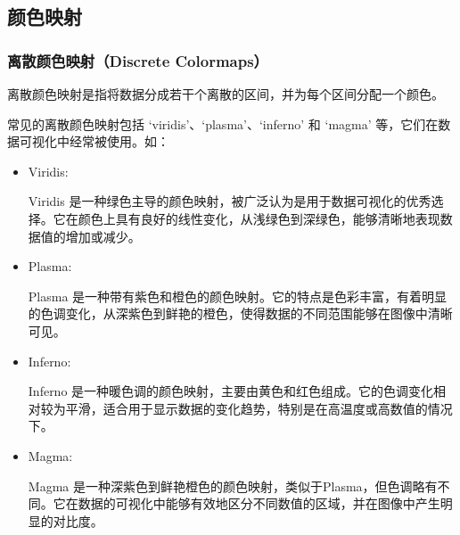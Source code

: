 \documentclass{article}
\begin{document}
\subsection{颜色映射}

\subsubsection{离散颜色映射（Discrete Colormaps）}
离散颜色映射是指将数据分成若干个离散的区间，并为每个区间分配一个颜色。

常见的离散颜色映射包括 ‘viridis’、‘plasma’、‘inferno’ 和 ‘magma’ 等，它们在数据可视化中经常被使用。如：
\begin{itemize}
    \item Viridis:

    Viridis 是一种绿色主导的颜色映射，被广泛认为是用于数据可视化的优秀选择。它在颜色上具有良好的线性变化，从浅绿色到深绿色，能够清晰地表现数据值的增加或减少。
   \item  Plasma:
    
    Plasma 是一种带有紫色和橙色的颜色映射。它的特点是色彩丰富，有着明显的色调变化，从深紫色到鲜艳的橙色，使得数据的不同范围能够在图像中清晰可见。
    \item Inferno:
    
    Inferno 是一种暖色调的颜色映射，主要由黄色和红色组成。它的色调变化相对较为平滑，适合用于显示数据的变化趋势，特别是在高温度或高数值的情况下。
    \item Magma:
    
    Magma 是一种深紫色到鲜艳橙色的颜色映射，类似于Plasma，但色调略有不同。它在数据的可视化中能够有效地区分不同数值的区域，并在图像中产生明显的对比度。
\end{itemize}
\end{document}
